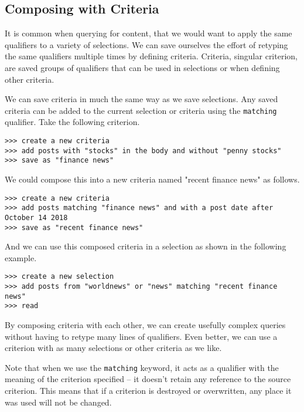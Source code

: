 \subsection{Composing with Criteria}
It is common when querying for content, that we would want to apply the same qualifiers to a
variety of selections. We can save ourselves the effort of retyping the same qualifiers multiple
times by defining criteria. Criteria, singular criterion, are saved groups of qualifiers that
can be used in selections or when defining other criteria.

We can save criteria in much the same way as we save selections. Any saved criteria can be
added to the current selection or criteria using the \texttt{matching} qualifier. Take the following criterion.
\newline\begin{minipage}{\linewidth}\begin{lstlisting}
>>> create a new criteria
>>> add posts with "stocks" in the body and without "penny stocks"
>>> save as "finance news"
\end{lstlisting}\end{minipage}
We could compose this into a new criteria named "recent finance news" as follows.
\newline\begin{minipage}{\linewidth}\begin{lstlisting}
>>> create a new criteria
>>> add posts matching "finance news" and with a post date after October 14 2018
>>> save as "recent finance news"
\end{lstlisting}\end{minipage}
And we can use this composed criteria in a selection as shown in the following example.
\newline\begin{minipage}{\linewidth}\begin{lstlisting}
>>> create a new selection
>>> add posts from "worldnews" or "news" matching "recent finance news"
>>> read
\end{lstlisting}\end{minipage}
By composing criteria with each other, we can create usefully complex queries without having
to retype many lines of qualifiers. Even better, we can use a criterion with as many selections or other criteria as we like.

Note that when we use the \texttt{matching} keyword, it acts as a qualifier with the meaning of the
criterion specified -- it doesn’t retain any reference to the source criterion. This means
that if a criterion is destroyed or overwritten, any place it was used will not be changed.

